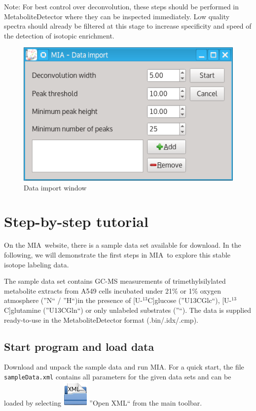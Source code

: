 \documentclass[a4paper,12pt]{scrartcl}
\newcommand*\app{\textsc{MIA}}
\begin{document}
Note: For best control over deconvolution, these steps should be performed in MetaboliteDetector where they can be inspected immediately. Low quality spectra should already be filtered at this stage to increase specificity and speed of the detection of isotopic enrichment.

\begin{figure}[htb]
 \centering
 \includegraphics[width=0.4\linewidth]{./gfx/ss_data_import.png}
  \caption{Data import window}
 \label{fig:data-import}
\end{figure}

\clearpage


\section{Step-by-step tutorial}

On the \app\ website, there is a sample data set available for download. In the following, we will demonstrate the first steps in \app\ to explore this stable isotope labeling data.

The sample data set contains GC-MS measurements of trimethylsilylated metabolite extracts from A549 cells incubated under 21\% or 1\% oxygen atmosphere (''N`` / ''H``)in the presence of [U-$^{13}$C]glucose (''U13CGlc``), [U-$^{13}$C]glutamine (''U13CGln``) or only unlabeled substrates (''``). The data is supplied ready-to-use in the MetaboliteDetector format (.bin/.idx/.cmp).

\subsection{Start program and load data}

Download and unpack the sample data and run \app. For a quick start, the file \texttt{sampleData.xml} contains all parameters for the given data sets and can be loaded by selecting \includegraphics{../gui/icons/document-open-xml.png} ''Open XML`` from the main toolbar.
\end{document}

